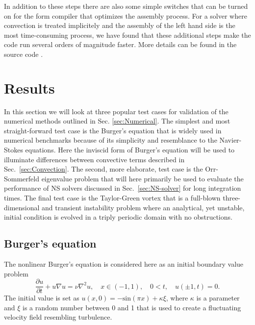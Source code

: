 In addition to these steps there are also some simple switches that can be turned on for the form compiler that optimizes the assembly process. For a solver where convection is treated implicitely and the assembly of the left hand side is the most time-consuming process, we have found that these additional steps make the code run several orders of magnitude faster. More details can be found in the source code \cite{folder}.

\section{Results}
\label{sec:testcases}
In this section we will look at three popular test cases for
validation of the numerical methods outlined in
Sec. \ref{sec:Numerical}. The simplest and most straight-forward test
case is the Burger's equation that is widely used in numerical
benchmarks because of its simplicity and resemblance to the
Navier-Stokes equations. Here the inviscid form of Burger's equation
will be used to illuminate differences between convective terms
described in Sec.~\ref{sec:Convection}. The second, more elaborate,
test case is the Orr-Sommerfeld eigenvalue problem that will here
primarily be used to evaluate the performance of NS solvers discussed
in Sec.~\ref{sec:NS-solver} for long integration times. The final test
case is the Taylor-Green vortex that is a full-blown three-dimensional
and transient instability problem where an analytical, yet unstable,
initial condition is evolved in a triply periodic domain with no
obstructions.

\subsection{Burger's equation}
\label{sec:burgers}
The nonlinear Burger's equation is considered here as an initial boundary value problem
\begin{equation}
 \frac{\partial u}{\partial t}+u\nabla u = \nu \nabla^2 u, \quad x \in (-1,1), \quad 0<t, \quad u(\pm 1,t)=0.
\label{eq:burgers}
\end{equation}
The initial value is set as $u(x,0)=-\text{sin}(\pi x)+\kappa \xi$, where $\kappa$ is a parameter and $\xi$ is a random number between 0 and 1 that is used to create a fluctuating velocity field resembling turbulence. %

